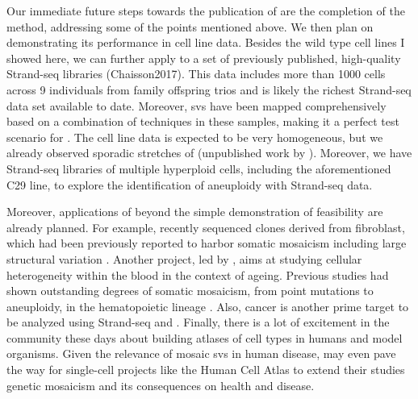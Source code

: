 Our immediate future steps towards the publication of \mc are the completion of
the method, addressing some of the points mentioned above. We then plan on
demonstrating its performance in cell line data. Besides the 
wild type cell lines I showed here, we can further apply \mc to a set of previously
published, high-quality Strand-seq libraries (Chaisson2017). This data
includes more than 1000 cells across 9 individuals from family offspring trios and
is likely the richest Strand-seq data set available to date. Moreover, \acp{sv}
have been mapped comprehensively based on a combination of techniques in these
samples, making it a perfect test scenario for \mc. The cell line data is
expected to be very homogeneous, but we already observed sporadic stretches of
\loh (unpublished work by \david). Moreover, we have Strand-seq libraries of
multiple hyperploid cells, including the aforementioned \rpe C29
line, to explore the identification of aneuploidy with Strand-seq data.

Moreover, applications of \mc beyond the simple demonstration of feasibility are
already planned. For example, \ashley recently sequenced clones derived
from fibroblast, which had been previously reported to harbor somatic mosaicism
including large structural variation \citep{Saini2016}. Another project, led by
\karen, aims at studying cellular heterogeneity within the blood in the context
of ageing. Previous studies had shown outstanding degrees of somatic mosaicism,
from point mutations to aneuploidy, in the hematopoietic lineage
\citep{Razzaghian2010,Holstege2014}. Also, cancer is another prime target to
be analyzed using Strand-seq and \mc. Finally, there is a lot of excitement in
the community these days about building atlases of cell types in humans and model
organisms. Given the relevance of mosaic \acp{sv} in human disease, \mc may even
pave the way for single-cell projects like the Human Cell Atlas \citep{Regev2017}
to extend their studies genetic mosaicism and its consequences on health and disease.
